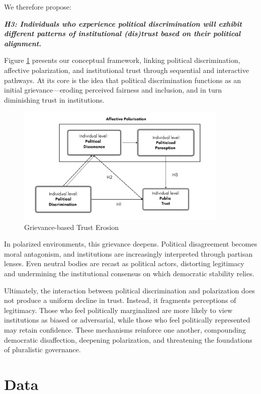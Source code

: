 \documentclass{article}
\begin{document}
We therefore propose:

\emph{\textbf{\small
H3: Individuals who experience political discrimination will exhibit different patterns of institutional (dis)trust based on their political alignment.
}}

Figure \ref{fig:0} presents our conceptual framework, linking political discrimination, affective polarization, and institutional trust through sequential and interactive pathways. At its core is the idea that political discrimination functions as an initial grievance—eroding perceived fairness and inclusion, and in turn diminishing trust in institutions.

\begin{figure}[htbp]
\centering
\caption{Grievance-based Trust Erosion}
\label{fig:0}
\includegraphics[width=0.9\textwidth]{"viz/theoretical_diagram.png"}
\end{figure}

In polarized environments, this grievance deepens. Political disagreement becomes moral antagonism, and institutions are increasingly interpreted through partisan lenses. Even neutral bodies are recast as political actors, distorting legitimacy and undermining the institutional consensus on which democratic stability relies.

Ultimately, the interaction between political discrimination and polarization does not produce a uniform decline in trust. Instead, it fragments perceptions of legitimacy. Those who feel politically marginalized are more likely to view institutions as biased or adversarial, while those who feel politically represented may retain confidence. These mechanisms reinforce one another, compounding democratic disaffection, deepening polarization, and threatening the foundations of pluralistic governance.

\section{Data}
\end{document}
